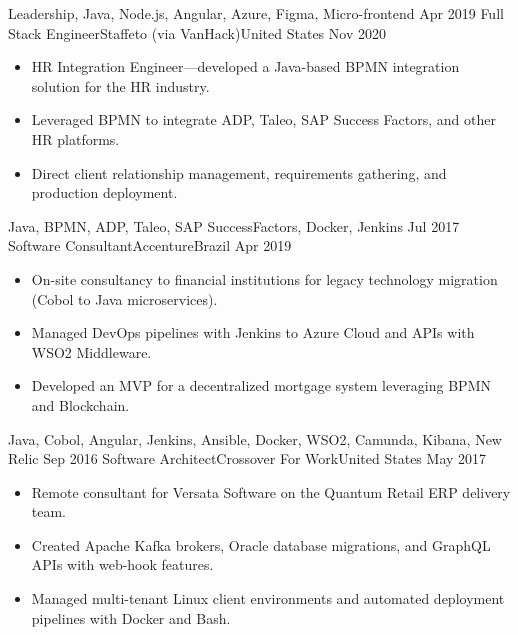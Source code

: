 \begin{experiences}
{                    }
                    {Leadership, Java, Node.js, Angular, Azure, Figma, Micro-frontend}
  \emptySeparator
  \experience
    {Apr 2019} {Full Stack Engineer}{Staffeto (via VanHack)}{United States}
    {Nov 2020}    {
                      \begin{itemize}
                        \item HR Integration Engineer—developed a Java-based BPMN integration solution for the HR industry.
                        \item Leveraged BPMN to integrate ADP, Taleo, SAP Success Factors, and other HR platforms.
                        \item Direct client relationship management, requirements gathering, and production deployment.
                      \end{itemize}
                    }
                    {Java, BPMN, ADP, Taleo, SAP SuccessFactors, Docker, Jenkins}
  \emptySeparator
  \experience
    {Jul 2017}     {Software Consultant}{Accenture}{Brazil}
    {Apr 2019}    {
                      \begin{itemize}
                        \item On-site consultancy to financial institutions for legacy technology migration (Cobol to Java microservices).
                        \item Managed DevOps pipelines with Jenkins to Azure Cloud and APIs with WSO2 Middleware.
                        \item Developed an MVP for a decentralized mortgage system leveraging BPMN and Blockchain.
                      \end{itemize}
                    }
                    {Java, Cobol, Angular, Jenkins, Ansible, Docker, WSO2, Camunda, Kibana, New Relic}
  \emptySeparator
  \experience
    {Sep 2016}     {Software Architect}{Crossover For Work}{United States}
    {May 2017}    {
                      \begin{itemize}
                        \item Remote consultant for Versata Software on the Quantum Retail ERP delivery team.
                        \item Created Apache Kafka brokers, Oracle database migrations, and GraphQL APIs with web-hook features.
                        \item Managed multi-tenant Linux client environments and automated deployment pipelines with Docker and Bash.
                      \end{itemize}
}
\end{experiences}
